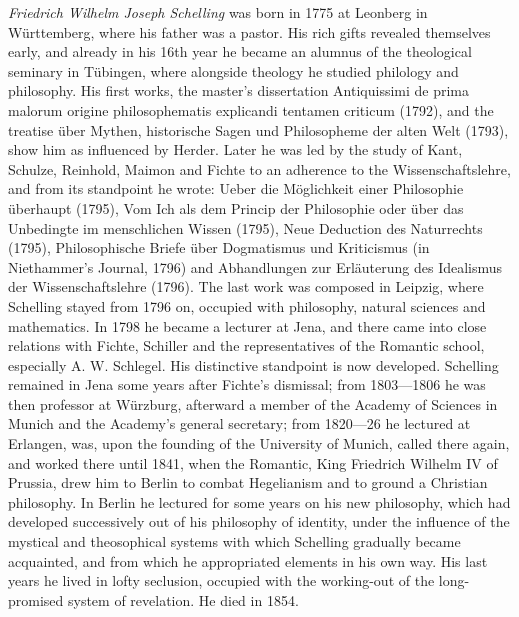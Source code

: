 \emph{Friedrich Wilhelm Joseph Schelling} was born in 1775 at Leonberg
in Württemberg, where his father was a pastor. His rich gifts revealed
themselves early, and already in his 16th year he became an alumnus of
the theological seminary in Tübingen, where alongside theology he
studied philology and philosophy. His first works, the master's
dissertation Antiquissimi de prima malorum origine
philosophematis explicandi tentamen criticum (1792), and the treatise
über Mythen, historische Sagen und Philosopheme der alten Welt (1793),
show him as influenced by Herder. Later he was led by the study of
Kant, Schulze, Reinhold, Maimon and Fichte to an adherence to the
Wissenschaftslehre, and from its standpoint he wrote: Ueber die
Möglichkeit einer Philosophie überhaupt (1795), Vom Ich als dem Princip
der Philosophie oder über das Unbedingte im menschlichen Wissen (1795),
Neue Deduction des Naturrechts (1795), Philosophische Briefe über
Dogmatismus und Kriticismus (in Niethammer's Journal, 1796) and
Abhandlungen zur Erläuterung des Idealismus der Wissenschaftslehre
(1796). The last work was composed in Leipzig, where Schelling stayed
from 1796 on, occupied with philosophy, natural sciences and
mathematics. In 1798 he became a lecturer at Jena, and there came into
close relations with Fichte, Schiller and the representatives of the
Romantic school, especially A. W. Schlegel. His distinctive standpoint
is now developed. Schelling remained in Jena some years after Fichte's
dismissal; from 1803---1806 he was then professor at Würzburg,
afterward a member of the Academy of Sciences in Munich and the
Academy's general secretary; from 1820---26 he lectured at Erlangen,
was, upon the founding of the University of Munich, called there again,
and worked there until 1841, when the Romantic, King Friedrich Wilhelm
IV of Prussia, drew him to Berlin to combat Hegelianism and to ground a
Christian philosophy. In Berlin he lectured for some years on his new
philosophy, which had developed successively out of his philosophy of
identity, under the influence of the mystical and theosophical systems
with which Schelling gradually became acquainted, and from which he
appropriated elements in his own way. His last years he lived in
lofty seclusion, occupied with the working-out of the long-promised
system of revelation. He died in 1854.

